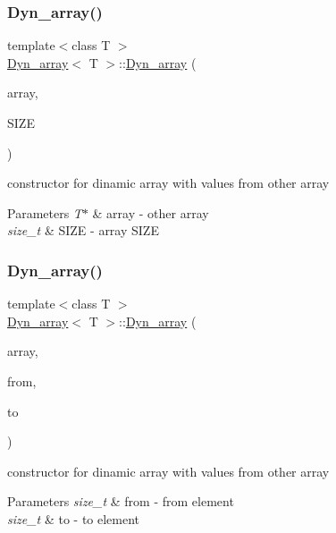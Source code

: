 \subsubsection{\texorpdfstring{Dyn\+\_\+array()}{Dyn\_array()}\hspace{0.1cm}{\footnotesize\ttfamily [4/6]}}
{\footnotesize\ttfamily template$<$class T $>$ \\
\hyperlink{classDyn__array}{Dyn\+\_\+array}$<$ T $>$\+::\hyperlink{classDyn__array}{Dyn\+\_\+array} (\begin{DoxyParamCaption}\item[{const T $\ast$}]{array,  }\item[{const size\+\_\+t}]{S\+I\+ZE }\end{DoxyParamCaption})}



constructor for dinamic array with values from other array 


\begin{DoxyParams}{Parameters}
{\em T$\ast$} & array -\/ other array \\
\hline
{\em size\+\_\+t} & S\+I\+ZE -\/ array S\+I\+ZE \\
\hline
\end{DoxyParams}
\mbox{\label{classDyn__array_a7fa28275bd20add3643eeab60e06a431}} 
\subsubsection{\texorpdfstring{Dyn\+\_\+array()}{Dyn\_array()}\hspace{0.1cm}{\footnotesize\ttfamily [5/6]}}
{\footnotesize\ttfamily template$<$class T $>$ \\
\hyperlink{classDyn__array}{Dyn\+\_\+array}$<$ T $>$\+::\hyperlink{classDyn__array}{Dyn\+\_\+array} (\begin{DoxyParamCaption}\item[{const T $\ast$}]{array,  }\item[{size\+\_\+t}]{from,  }\item[{const size\+\_\+t}]{to }\end{DoxyParamCaption})}



constructor for dinamic array with values from other array 


\begin{DoxyParams}{Parameters}
{\em size\+\_\+t} & from -\/ from element \\
\hline
{\em size\+\_\+t} & to -\/ to element \\
\hline
\end{DoxyParams}
\mbox{\label{classDyn__array_a83d19f61fc7cef07e8125911729fd3bf}} 
